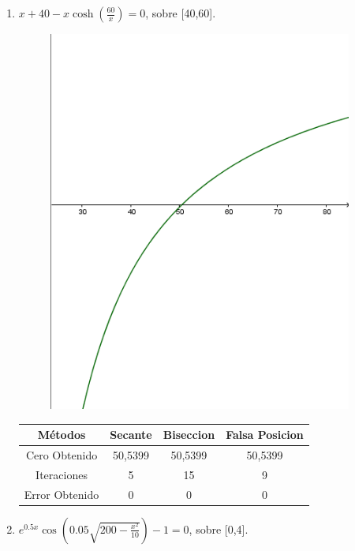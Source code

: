 \documentclass{udparticle}
\begin{document}
\begin{enumerate}
\begin{enumerate}
    \item \(x + 40 -x\cosh(\frac{60}{x}) = 0 \), sobre [40,60].\\
        \begin{figure}[H]
            \centering
            \includegraphics[width=10cm]{GraficoEj1c}
        \end{figure}
            \begin{table}[H]
            \centering
                \begin{tabular} { |c|c|c|c|}
                
                \hline
                Métodos       & Secante & Biseccion & Falsa Posicion  \\
                \hline
                Cero Obtenido &  50,5399       &    50,5399       &      50,5399          \\
                \hline
                Iteraciones   &     5        &      15     &        9        \\
                \hline
                Error Obtenido &    0       &       0       &       0   \\
                \hline 
                
                \end{tabular}
            \end{table}
    \newpage
    
    \item \(e^{0.5x}\cos(0.05\sqrt{200-\frac{x^2}{10}}) -1 = 0 \), sobre [0,4].\\
        

\end{enumerate}
\end{enumerate}
\end{document}
